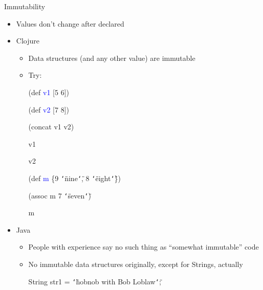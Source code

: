 \documentclass{beamer}
\renewcommand{\textquotedbl}{\texttt{\char`\"}}
\begin{document}
\begin{frame}[allowframebreaks]{Immutability}
  \begin{itemize}
  \item Values don't change after declared
  \item Clojure
    \begin{itemize}
    \item Data structures (and any other value) are immutable
    \item Try:\\
\begin{small}
{\ttfamily\color{black}
%
\textcolor[rgb]{0.54901963,0.54901963,0.54901963}{(}\textcolor[rgb]{0.49803922,0.0,0.49803922}{def}
\textcolor{blue}{v1} [5
6]\textcolor[rgb]{0.54901963,0.54901963,0.54901963}{)}}

{\ttfamily\color{black}
\textcolor[rgb]{0.54901963,0.54901963,0.54901963}{(}\textcolor[rgb]{0.49803922,0.0,0.49803922}{def}
\textcolor{blue}{v2} [7
8]\textcolor[rgb]{0.54901963,0.54901963,0.54901963}{)}}

{\ttfamily\color{black}
\textcolor[rgb]{0.54901963,0.54901963,0.54901963}{(}\textcolor[rgb]{0.28235295,0.23921569,0.54509807}{concat}
v1 v2\textcolor[rgb]{0.54901963,0.54901963,0.54901963}{)}}

{\ttfamily\color{black}
v1}

{\ttfamily\color{black}
v2}

{\ttfamily\color{black}
\textcolor[rgb]{0.54901963,0.54901963,0.54901963}{(}\textcolor[rgb]{0.49803922,0.0,0.49803922}{def}
\textcolor{blue}{m} \{9
\textcolor[rgb]{0.54509807,0.13333334,0.32156864}{{\textquotedbl}nine{\textquotedbl}},
8
\textcolor[rgb]{0.54509807,0.13333334,0.32156864}{{\textquotedbl}eight{\textquotedbl}}\}\textcolor[rgb]{0.54901963,0.54901963,0.54901963}{)}}

{\ttfamily\color{black}
\textcolor[rgb]{0.54901963,0.54901963,0.54901963}{(}\textcolor[rgb]{0.28235295,0.23921569,0.54509807}{assoc}
m 7
\textcolor[rgb]{0.54509807,0.13333334,0.32156864}{{\textquotedbl}seven{\textquotedbl}}\textcolor[rgb]{0.54901963,0.54901963,0.54901963}{)}}

{\ttfamily\color{black}
m}
\end{small}
    \end{itemize}
  \item Java
    \begin{itemize}
    \item People with experience say no such thing as ``somewhat
      immutable'' code
    \item No immutable data structures originally, except for Strings,
      actually\\
\begin{small}
{\ttfamily\color{black}
%
\textcolor[rgb]{0.13333334,0.54509807,0.13333334}{String}
\textcolor[rgb]{0.627451,0.32156864,0.1764706}{str1} =
\textcolor[rgb]{0.54509807,0.13333334,0.32156864}{{\textquotedbl}hobnob
with Bob Loblaw{\textquotedbl}};}


\end{small}
\end{itemize}
\end{itemize}
\end{frame}
\end{document}
